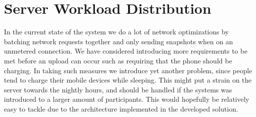 \section{Server Workload Distribution}

In the current state of the system we do a lot of network optimizations by batching network requests together and only sending snapshots when on an unmetered connection. We have considered introducing more requirements to be met before an upload can occur such as requiring that the phone should be charging. In taking such measures we introduce yet another problem, since people tend to charge their mobile devices while sleeping. This might put a strain on the server towards the nightly hours, and should be handled if the systems was introduced to a larger amount of participants. This would hopefully be relatively easy to tackle due to the architecture implemented in the developed solution. 